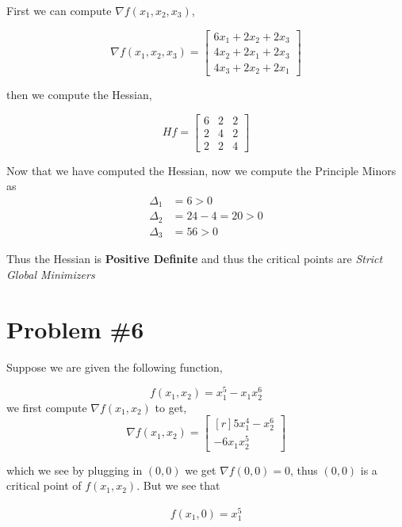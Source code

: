 \documentclass{article}
\begin{document}
First we can compute $\nabla f(x_1,x_2,x_3) $,

\begin{equation*}
    \nabla f(x_1,x_2,x_3) = \begin{bmatrix*}
        6x_1 + 2x_2 + 2x_3\\
        4x_2 + 2x_1 + 2x_3\\
        4x_3 + 2x_2 + 2x_1
    \end{bmatrix*}
\end{equation*}

then we compute the Hessian,

\begin{equation*}
    Hf = \begin{bmatrix*}
        6 & 2 & 2 \\
        2 & 4& 2\\
        2 & 2 & 4
    \end{bmatrix*}
\end{equation*}

Now that we have computed the Hessian, now we compute the Principle Minors as
\begin{align*}
    \Delta_1 &= 6 > 0\\
    \Delta_2 &= 24 - 4 = 20 > 0 \\
    \Delta_3 &= 56 > 0
\end{align*}

Thus the Hessian is \textbf{Positive Definite} and thus the critical points are \textit{Strict Global Minimizers}

\section*{Problem \#6}
Suppose we are given the following function,

\begin{equation*}
    f(x_1,x_2) = x_1^5 - x_1x_2^6
\end{equation*}
we first compute $\nabla f(x_1,x_2)$ to get,
\begin{equation*}
    \nabla f(x_1,x_2) = \begin{bmatrix*}[r]
        5x_1^4 - x_2^6\\
        -6x_1x_2^5
    \end{bmatrix*}
\end{equation*}

which we see by plugging in $(0,0)$ we get $\nabla f(0,0) = 0$, thus $(0,0)$ is a critical point of $f(x_1,x_2)$. But we see that

\begin{align*}
    f(x_1,0) = x_1^5
\end{align*}
\end{document}
